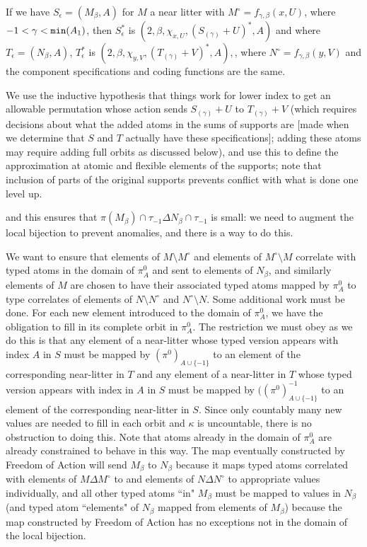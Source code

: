 \documentclass[112pt]{article}
\begin{document}
\begin{description}
If we have $S_\epsilon= (M_\beta,A)$ for $M$ a near litter with $M^\circ = f_{\gamma,\beta}(x,U)$, where $-1<\gamma<{\tt min}(A_1)$,
then $S^*_\epsilon$ is $(2,\beta,\chi_{x,U},(S_{(\gamma)} +U)^*,A)$ and where $T_\epsilon=(N_\beta,A)$, $T^*_\epsilon$ is $(2,\beta,\chi_{y,V},(T_{(\gamma)} +V)^*,A),$, where $N^\circ = f_{\gamma,\beta}(y,V)$ and the component specifications and coding functions are the same.

We use the inductive hypothesis that things work for lower index to get an allowable permutation whose action sends $S_{(\gamma)} +U$ to $T_{(\gamma)} +V$ (which requires decisions about what the added atoms in the sums of supports are [made when we determine that $S$ and $T$ actually have these specifications];  adding these atoms may require adding full orbits as discussed below), and use this to define
the approximation at atomic and flexible elements of the supports;  note that inclusion of parts of the original supports prevents conflict with what is done one level up.

and this ensures that $\pi(M_\beta)\cap \tau_{-1} \Delta N_\beta\cap \tau_{-1}$ is small:  we need to augment the local bijection to prevent anomalies, and there is a way to do this.

We want to ensure that elements of $M \setminus M^{\circ}$ and elements of $M^{\circ} \setminus M$ correlate with typed atoms in the domain of $\pi^0_A$ and sent to elements of $N_\beta$, and similarly elements of $M$ are chosen to have their associated typed atoms mapped by $\pi^0_A$ to type correlates of elements of $N\setminus N^\circ$ and $N^\circ \setminus N$.
 Some additional work must be done.  For each new element introduced to the domain of $\pi^0_A$, we have the obligation to fill in its complete orbit in $\pi^0_A$.   The restriction we must obey as we do this is that any element of a near-litter whose typed version appears with index $A$ in $S$ must be mapped by $(\pi^0)_{A\cup \{-1\}}$ to an element of the corresponding near-litter in $T$ and any element of a near-litter in $T$  whose typed version appears with index in $A$ in $S$ must be mapped by $((\pi^0)_{A\cup \{-1\}}^{-1}$ to an element of the corresponding near-litter in $S$.  Since only countably many new values are needed to fill in each orbit and $\kappa$ is uncountable, there is no obstruction to doing this.  Note that atoms already in the domain of $\pi^0_A$ are already constrained to behave in this way.  The map eventually constructed by Freedom of Action will send
$M_\beta$ to $N_\beta$ because it maps typed atoms correlated with elements of $M \Delta M^\circ$ to and elements of $N \Delta N^{\circ}$ to appropriate values individually, and all other typed atoms ``in" $M_\beta$ must be mapped to values in $N_\beta$ (and typed atom ``elements" of $N_\beta$ mapped from elements of $M_\beta$) because the map constructed by Freedom of Action has no exceptions not in the domain of the local bijection.


\end{description}
\end{document}
